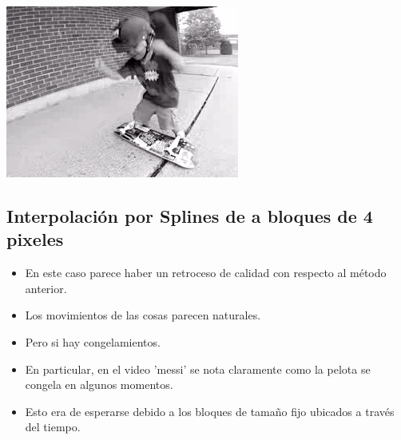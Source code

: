 \includegraphics[scale=1]{imagenes/art2.png}

\subsection{Interpolación por Splines de a bloques de 4 pixeles}

\begin{itemize}
\item En este caso parece haber un retroceso de calidad con respecto al método anterior.
\item Los movimientos de las cosas parecen naturales.
\item Pero si hay congelamientos.
\item En particular, en el video 'messi' se nota claramente como la pelota se congela en algunos momentos.
\item Esto era de esperarse debido a los bloques de tamaño fijo ubicados a través del tiempo.
\end{itemize}
